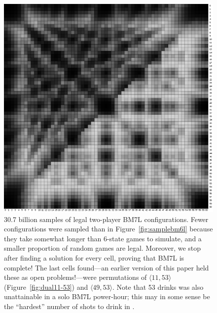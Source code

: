 \documentclass[twocolumn]{article}
\begin{document}
\begin{figure}[ht!]
\begin{center}
\includegraphics[width=0.90 \linewidth]{sample60min2players7states.png}
\end{center}\vspace{-0.1in}
\caption{ 30.7 billion samples of legal two-player BM7L
  configurations. Fewer configurations were sampled than in
  Figure~\ref{fig:samplebm6l} because they take somewhat longer than
  6-state games to simulate, and a smaller proportion of random games
  are legal. Moreover, we stop after finding a solution for every
  cell, proving that BM7L is complete! The last cells found---an
  earlier version of this paper held these as open problems!---were
  permutations of $\langle 11, 53 \rangle$
  (Figure~\ref{fig:dual11-53}) and $\langle 49, 53 \rangle$. Note that
  53 drinks was also unattainable in a solo BM7L power-hour; this may
  in some sense be the ``hardest'' number of shots to drink in \bmsl.
}
\label{fig:samplebm7l}
\end{figure}
\end{document}
